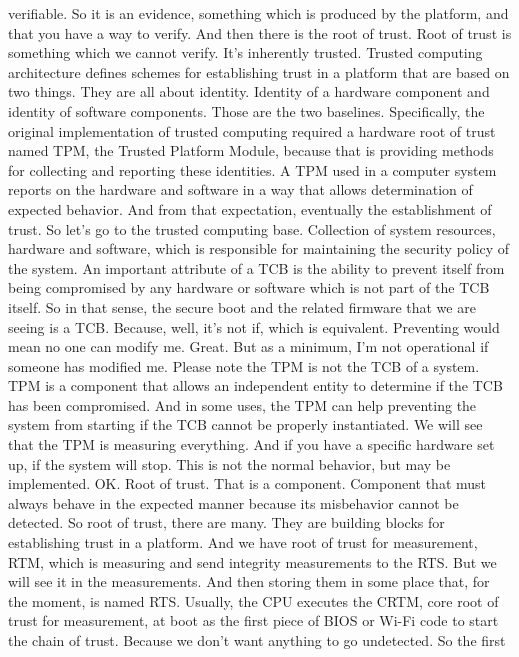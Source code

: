  verifiable. So it is an evidence, something which is produced by the platform,
 and that you have a way to verify. And then there is the root of trust. Root
 of trust is something which we cannot verify. It's inherently trusted. Trusted
 computing architecture defines schemes for establishing trust in a platform
 that are based on two things. They are all about identity. Identity of a
 hardware component and identity of software components. Those are the two
 baselines. Specifically, the original implementation of trusted computing
 required a hardware root of trust named TPM, the Trusted Platform Module,
 because that is providing methods for collecting and reporting these
 identities. A TPM used in a computer system reports on the hardware and
 software in a way that allows determination of expected behavior. And from
 that expectation, eventually the establishment of trust. So let's go to the
 trusted computing base. Collection of system resources, hardware and software,
 which is responsible for maintaining the security policy of the system. An
 important attribute of a TCB is the ability to prevent itself from being
 compromised by any hardware or software which is not part of the TCB itself.
 So in that sense, the secure boot and the related firmware that we are seeing
 is a TCB. Because, well, it's not if, which is equivalent. Preventing would
 mean no one can modify me. Great. But as a minimum, I'm not operational if
 someone has modified me. Please note the TPM is not the TCB of a system. TPM
 is a component that allows an independent entity to determine if the TCB has
 been compromised. And in some uses, the TPM can help preventing the system
 from starting if the TCB cannot be properly instantiated. We will see that the
 TPM is measuring everything. And if you have a specific hardware set up, if
 the system will stop. This is not the normal behavior, but may be implemented.
 OK. Root of trust. That is a component. Component that must always behave in
 the expected manner because its misbehavior cannot be detected. So root of
 trust, there are many. They are building blocks for establishing trust in a
 platform. And we have root of trust for measurement, RTM, which is measuring
 and send integrity measurements to the RTS. But we will see it in the
 measurements. And then storing them in some place that, for the moment, is
 named RTS. Usually, the CPU executes the CRTM, core root of trust for
 measurement, at boot as the first piece of BIOS or Wi-Fi code to start the
 chain of trust. Because we don't want anything to go undetected. So the first
